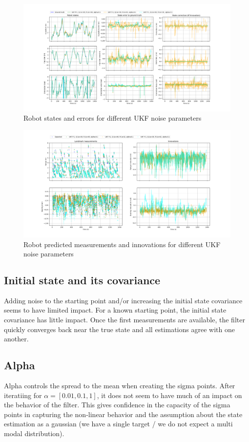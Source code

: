 \documentclass{article}
\begin{document}
\begin{figure}
\centering
\includegraphics[width=\textwidth]{Figure_7.png}
\caption{Robot states and errors for different UKF noise parameters}
\label{fig:figure7}
\end{figure}

\begin{figure}
\centering
\includegraphics[width=\textwidth]{Figure_8.png}
\caption{Robot predicted measurements and innovations for different UKF noise parameters}
\label{fig:figure8}
\end{figure}

\subsection{Initial state and its covariance}
Adding noise to the starting point and/or increasing the initial state covariance seems to have limited impact. For a known starting point, the initial state covariance has little impact. Once the first measurements are available, the filter quickly converges back near the true state and all estimations agree with one another.

\subsection{Alpha}
Alpha controls the spread to the mean when creating the sigma points. After iteratiing for $\alpha=[0.01, 0.1, 1]$, it does not seem to have much of an impact on the behavior of the filter. This gives confidence in the capacity of the sigma points in capturing the non-linear behavior and the assumption about the state estimation as a gaussian (we have a single target / we do not expect a multi modal distribution).
\end{document}

